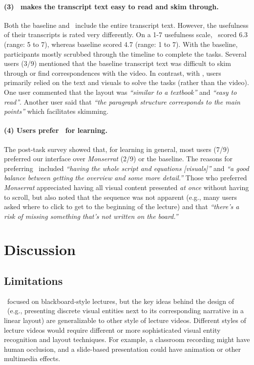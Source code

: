 \paragraph{(3) \systemname\ makes the transcript text easy to read and skim through.}
Both the baseline and \systemname\ include the entire transcript text. However,
the usefulness of their transcripts is rated very differently. On a 1-7 usefulness
scale, \systemname\ scored 6.3 (range: 5 to 7), whereas baseline scored 4.7
(range: 1 to 7). With the baseline, participants mostly scrubbed
through the timeline to complete the tasks. Several users (3/9) mentioned
that the baseline transcript text was difficult to skim through or find correspondences
with the video. In contrast, with \systemname, users primarily relied on
the text and visuals to solve the tasks (rather than the video). One user
commented that the layout was \textit{``similar to a textbook''} and \textit{``easy
to read''}. Another user said that \textit{``the paragraph structure corresponds
to the main points''} which facilitates skimming.

\paragraph{(4) Users prefer \systemname\ for learning.}
The post-task survey showed that, for learning in general, most users (7/9) preferred our interface over \textit{Monserrat} (2/9) or the baseline. 
The reasons for preferring \systemname\ included \textit{``having the whole script and equations [visuals]''} and \textit{``a good balance between getting the overview and some more detail.''} Those who preferred \textit{Monserrat} appreciated having all visual content presented \textit{at once} without having to scroll, but also noted that the sequence was not apparent (e.g., many users asked where to click to get to the beginning of the lecture) and that \textit{``there's a risk of missing something that's not written on the board.''}\\
\section{Discussion}
\label{sec:discussion}
\subsection{Limitations}
\systemname\ focused on blackboard-style lectures, but the key ideas behind the design of \systemname\ (e.g., presenting discrete visual entities next to its corresponding narrative in a linear layout) are generalizable to other style of lecture videos. Different styles of lecture videos would require different or more sophisticated visual entity recognition and layout techniques. For example, a classroom recording might have human occlusion, and a slide-based presentation could have animation or other multimedia effects.\\

